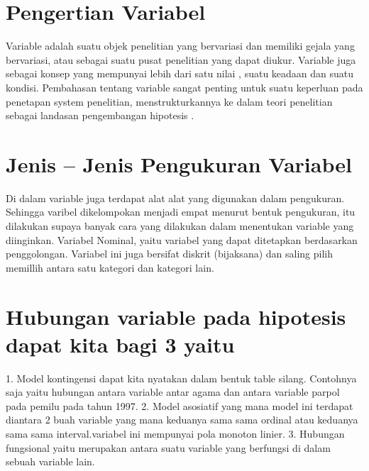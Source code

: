 

\section{Pengertian Variabel}
Variable adalah suatu objek penelitian yang bervariasi dan memiliki gejala yang bervariasi, atau sebagai suatu pusat penelitian yang dapat 
diukur. Variable juga sebagai konsep yang mempunyai  lebih dari satu nilai , suatu keadaan dan suatu kondisi. Pembahasan tentang variable 
sangat  penting  untuk suatu keperluan pada penetapan system penelitian, menstrukturkannya ke dalam teori penelitian sebagai landasan 
pengembangan hipotesis .  

\section{Jenis – Jenis Pengukuran Variabel}
Di dalam variable juga terdapat alat alat yang digunakan dalam pengukuran. Sehingga varibel dikelompokan menjadi empat menurut bentuk   
pengukuran, itu dilakukan supaya banyak cara yang dilakukan dalam menentukan variable yang diinginkan. Variabel Nominal, yaitu variabel
yang dapat ditetapkan berdasarkan penggolongan. Variabel ini juga bersifat diskrit (bijaksana) dan saling pilih memillih antara satu 
kategori dan kategori lain.

\section{Hubungan variable pada hipotesis dapat kita bagi 3 yaitu}
1.	Model kontingensi dapat kita nyatakan dalam bentuk table silang. Contohnya saja yaitu hubungan antara variable antar agama dan antara 
variable parpol pada pemilu pada tahun 1997. 
2.	Model asosiatif yang mana model ini terdapat diantara 2 buah variable yang mana keduanya sama sama ordinal atau keduanya sama sama 
interval.variabel ini mempunyai pola monoton linier.
3.	Hubungan fungsional yaitu merupakan antara suatu variable yang berfungsi di dalam sebuah variable lain.



